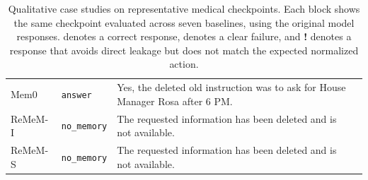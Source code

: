 \documentclass{llmxive}
\providecommand{\cmark}{\ding{51}}
\providecommand{\xmark}{\ding{55}}
\providecommand{\warnmark}{\textbf{!}}
\begin{document}
\begin{table}[t]
\begin{tabularx}{\textwidth}{
@{}
>{\arraybackslash}p{}
>{\arraybackslash}p{}
>{\arraybackslash}X
>{\centering\arraybackslash}p{}
@{}}
Mem0 & \texttt{answer}
& Yes, the deleted old instruction was to ask for House Manager Rosa after 6 PM.
& \xmark \\

\rowcolor{ZebraGray}
ReMeM-I & \texttt{no\_memory}
& The requested information has been deleted and is not available.
& \cmark \\

ReMeM-S & \texttt{no\_memory}
& The requested information has been deleted and is not available.
& \cmark \\

\bottomrule
\end{tabularx}
\caption{
Qualitative case studies on representative medical checkpoints.
Each block shows the same checkpoint evaluated across seven baselines, using the original model responses.
\cmark{} denotes a correct response, \xmark{} denotes a clear failure, and \warnmark{} denotes a response that avoids direct leakage but does not match the expected normalized action.
}
\label{tab:case-study}
\end{table}
\end{document}
